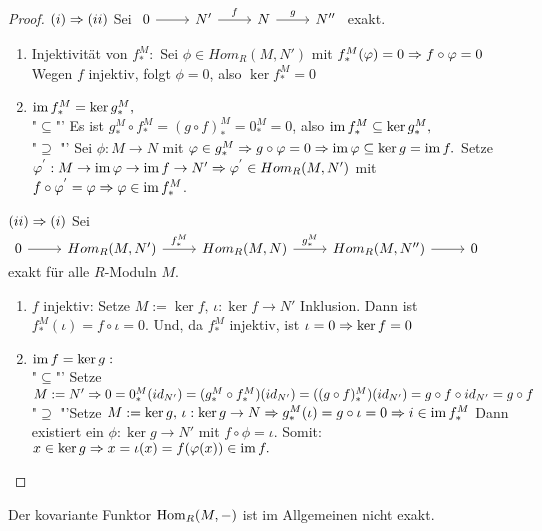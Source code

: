 \begin{proof}
	$(i) \Rightarrow (ii)$ Sei $\begin{tikzcd}
	0  \arrow{r} & N' \arrow{r}{f} & N \arrow{r}{g} & N'' 
	\end{tikzcd} $ exakt. 
	\begin{enumerate}
		\item Injektivität von $f_{*}^{M}: $ Sei $ \phi \in Hom_{R}(M,N')$ mit $f_{*}^{M}(\varphi) = 0 \Rightarrow f \circ \varphi = 0$ Wegen $f$ injektiv, folgt $\phi = 0$, also $ \ker f_{*}^{M} = 0$
		\item $\operatorname{im} f_{*}^{M} = \ker g_{*}^{M},$ \\
		"$\subseteq$"' Es  ist $g_{*}^{M} \circ f_{*}^{M} = (g \circ f)_{*}^{M} = 0_{*}^{M} = 0$, also $\operatorname{im} f_{*}^{M} \subseteq \ker g_{*}^{M},$ \\
		"$\supseteq$ "' 
		Sei $\phi: M \to N $ mit $ \varphi \in  g_{*}^{M} \Rightarrow g \circ \varphi = 0 \Rightarrow \operatorname{im} \varphi  \subseteq \ker g = \operatorname{im} f. $ Setze $\varphi^{'}: M \to \operatorname{im} \varphi \to \operatorname{im} f  \to N' \Rightarrow \varphi^{'} \in Hom_{R}(M,N') $ mit $ f \circ \varphi^{'} = \varphi \Rightarrow \varphi \in \operatorname{im} f_{*}^{M}$.
	\end{enumerate}
	$(ii) \Rightarrow (i)$ Sei $\begin{tikzcd}
	0  \arrow{r} & Hom_{R}(M,N') \arrow{r}{f_{*}^{M}} & Hom_{R}(M,N)  \arrow{r}{g_{*}^{M}} & Hom_{R}(M,N'') \arrow{r} & 0
	\end{tikzcd} $ exakt für alle $R$-Moduln $M$.
	\begin{enumerate}
		\item $f$ injektiv: Setze $M := \ker f , \, \iota: \ker f \to N' $ Inklusion. Dann ist
		 $f_{*}^{M}(\iota)  = f \circ \iota = 0$. Und, da $f_{*}^{M}$ injektiv, ist $ \iota = 0 \Rightarrow \ker f = 0$
		\item $\operatorname{im} f = \ker g: $ \\
		"$\subseteq$"' Setze $M := N' \Rightarrow 0 = 0_{*}^{M}(id_{N'}) = (g_{*}^{M} \circ f_{*}^{M}) (id_{N'}) = ((g \circ f)_{*}^{M})(id_{N'}) = g \circ f \circ id_{N'} = g \circ f $ \\
		"$\supseteq$ "'Setze $M := \ker g , \, \iota: \ker g \to N \Rightarrow g_{*}^{M} (\iota) = g \circ \iota = 0 \Rightarrow i \in \operatorname{im} f_{*}^{M}$ Dann existiert ein $\phi: \ker g \to N' $ mit $ f \circ \phi = \iota. $ Somit: $ x \in \ker g \Rightarrow x = \iota(x) = f(\varphi(x)) \in \operatorname{im} f.$
	\end{enumerate}
\end{proof}
\begin{anm}
	Der kovariante Funktor $\operatorname{Hom}_R(M,-) $ ist im Allgemeinen nicht exakt.
\end{anm}

